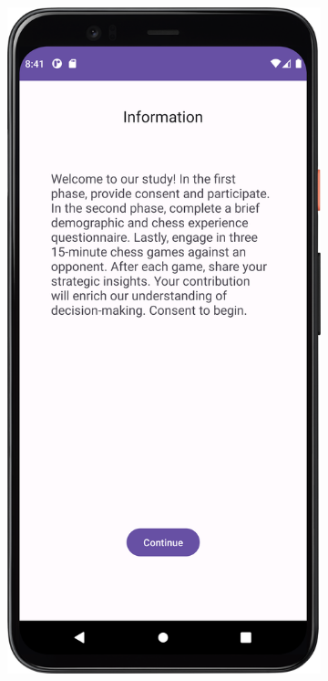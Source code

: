 \begin{figure}[htbp]
    \centering
    \begin{subfigure}[b]{0.25\textwidth}
        \centering
        \includegraphics[width=\textwidth]{content/06_demonstration_of_the_artifact/Screenshot_InfoScreen.png}

\end{subfigure}
\end{figure}
